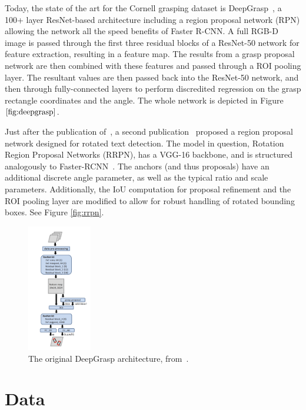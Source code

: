 \documentclass[10pt,twocolumn,letterpaper]{article}
\begin{document}
Today, the state of the art for the Cornell grasping dataset is DeepGrasp~\cite{vela2018}, a 100+ layer ResNet-based architecture including a region proposal network (RPN) allowing the network all the speed benefits of Faster R-CNN. A full RGB-D image is passed through the first three residual blocks of a ResNet-50 network for feature extraction, resulting in a feature map. The results from a grasp proposal network are then combined with these features and passed through a ROI pooling layer. The resultant values are then passed back into the ResNet-50 network, and then through fully-connected layers to perform discredited regression on the grasp rectangle coordinates and the angle. The whole network is depicted in Figure $\ref{fig:deepgrasp}$.

Just after the publication of~\cite{vela2018}, a second publication~\cite{ma18} proposed a region proposal network designed for rotated text detection. The model in question, Rotation Region Proposal Networks (RRPN), has a VGG-16 backbone, and is structured analogously to Faster-RCNN~\cite{ren15}. The anchors (and thus proposals) have an additional discrete angle parameter, as well as the typical ratio and scale parameters. Additionally, the IoU computation for proposal refinement and the ROI pooling layer are modified to allow for robust handling of rotated bounding boxes. See Figure \ref{fig:rrpn}.

\begin{figure}
    \centering
    \includegraphics[width=0.25\textwidth]{latex/deepgrasp.png}
    \caption{The original DeepGrasp architecture, from~\cite{vela2018}.}
    \label{fig:deepgrasp}
\end{figure}




\section{Data}
\end{document}
